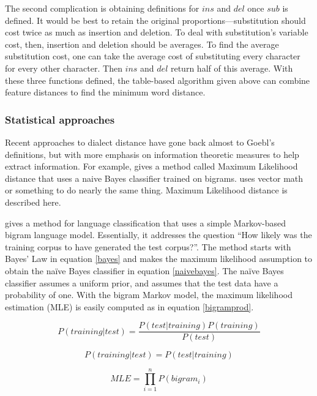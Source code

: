 \documentclass[11pt]{article}
\begin{document}
The second complication is obtaining definitions for $ins$ and $del$
once $sub$ is defined. It would be best to retain the original
proportions---substitution should cost twice as much as insertion and
deletion. To deal with substitution's variable cost, then, insertion and
deletion should be averages. To find the average substitution cost, one can
 take the average cost of substituting every character
for every other character. Then $ins$ and $del$ return half of this
average. With these three functions defined, the table-based algorithm
given above can combine feature distances to find the minimum word distance.

\subsubsection{Statistical approaches}
Recent approaches to dialect distance have gone back almost to Goebl's
definitions, but with more emphasis on information theoretic measures
to help extract information. For example,  gives a
method called Maximum Likelihood distance that uses a naive Bayes
classifier trained on bigrams.  uses vector math or
something to do nearly the same thing. Maximum Likelihood distance is
described here.

\label{dunningalgorithm}

\cite{dunning94} gives a method for language classification that uses
a simple Markov-based bigram language model. Essentially, it addresses
the question ``How likely was the training corpus to have generated
the test corpus?''. The method starts with Bayes' Law in equation
\ref{bayes} and makes the maximum likelihood assumption to obtain the
na\"ive Bayes classifier in equation \ref{naivebayes}.  The na\"ive
Bayes classifier assumes a uniform prior, and assumes that the test
data have a probability of one.
With the bigram Markov model, the maximum likelihood estimation (MLE) is
easily computed as in equation \ref{bigramprod}.

\begin{equation}
\label{bayes}
P(training|test) = \frac{P(test|training) P(training)}{P(test)}
\end{equation}

\begin{equation}
\label{naivebayes}
P(training|test) = P(test|training)
\end{equation}

\begin{equation}
\label{bigramprod}
MLE = \prod_{i=1}^n P(bigram_i)
\end{equation}
\end{document}
